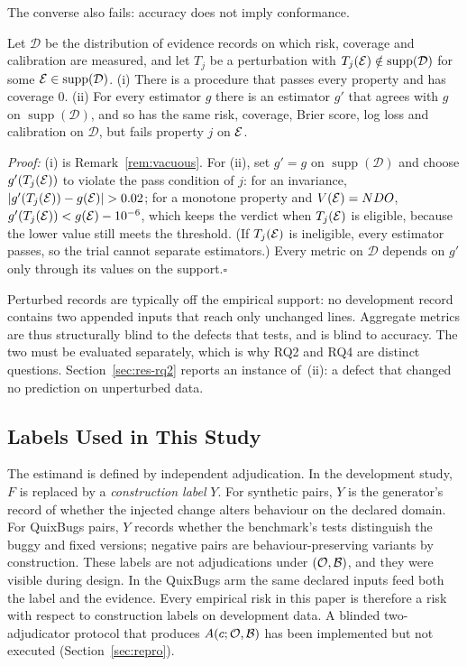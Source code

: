The converse also fails: accuracy does not imply conformance.

\begin{proposition}\label{prop:indep}
Let $\mathcal{D}$ be the distribution of evidence records on which risk, coverage and calibration are measured, and let $T_j$ be a perturbation with $T_j(\mathcal{E})\notin\operatorname{supp}(\mathcal{D})$ for some $\mathcal{E}\in\operatorname{supp}(\mathcal{D})$. (i) There is a procedure that passes every \ers{} property and has coverage $0$. (ii) For every estimator $g$ there is an estimator $g'$ that agrees with $g$ on $\operatorname{supp}(\mathcal{D})$, and so has the same risk, coverage, Brier score, log loss and calibration on $\mathcal{D}$, but fails property $j$ on $\mathcal{E}$.
\end{proposition}
\emph{Proof:} (i) is Remark~\ref{rem:vacuous}. For (ii), set $g'=g$ on $\operatorname{supp}(\mathcal{D})$ and choose $g'(T_j(\mathcal{E}))$ to violate the pass condition of $j$: for an invariance, $|g'(T_j(\Ev))-g(\Ev)|>0.02$; for a monotone property and $V(\mathcal{E})=NDO{}$, $g'(T_j(\mathcal{E}))<g(\mathcal{E})-10^{-6}$, which keeps the verdict \NDO{} when $T_j(\mathcal{E})$ is eligible, because the lower value still meets the threshold. (If $T_j(\mathcal{E})$ is ineligible, every estimator passes, so the trial cannot separate estimators.) Every metric on $\mathcal{D}$ depends on $g'$ only through its values on the support.\hfill$\square$

Perturbed records are typically off the empirical support: no development record contains two appended inputs that reach only unchanged lines. Aggregate metrics are thus structurally blind to the defects that \ers{} tests, and \ers{} is blind to accuracy. The two must be evaluated separately, which is why RQ2 and RQ4 are distinct questions. Section~\ref{sec:res-rq2} reports an instance of~(ii): a defect that changed no prediction on unperturbed data.

\subsection{Labels Used in This Study}
The estimand is defined by independent adjudication. In the development study, $F$ is replaced by a \emph{construction label} $Y$. For synthetic pairs, $Y$ is the generator's record of whether the injected change alters behaviour on the declared domain. For QuixBugs pairs, $Y$ records whether the benchmark's tests distinguish the buggy and fixed versions; negative pairs are behaviour-preserving variants by construction. These labels are not adjudications under $(\mathcal{O},\mathcal{B})$, and they were visible during design. In the QuixBugs arm the same declared inputs feed both the label and the evidence. Every empirical risk in this paper is therefore a risk with respect to construction labels on development data. A blinded two-adjudicator protocol that produces $A(c;\mathcal{O},\mathcal{B})$ has been implemented but not executed (Section~\ref{sec:repro}).
